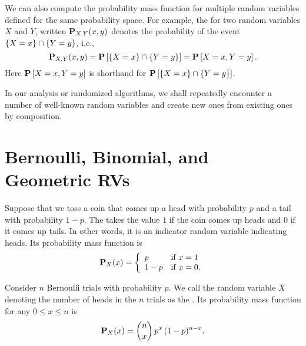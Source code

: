 \begin{gram}
We can also compute the probability mass function for multiple random
variables defined for the same probability space.
%
For example, the  for two random
variables $X$ and $Y$, written $\mathbf{P}_{X,Y}(x,y)$ denotes the
probability of the event $\{X =x\} \cap \{Y =y\}$, i.e.,
\[
\mathbf{P}_{X,Y}(x,y) = \mathbf{P}\left[{\{X =x\} \cap \{Y =y\}}\right] = \mathbf{P}\left[{X = x, Y = y}\right].
\]
%
Here
 $\mathbf{P}\left[{X = x, Y = y}\right]$ is shorthand for   $\mathbf{P}\left[{\{X =x\} \cap \{Y =y\}}\right]$.


In our analysis or randomized algorithms, we shall repeatedly
encounter a number of well-known random variables and create new ones
from existing ones by composition.
\end{gram}


\section{Bernoulli, Binomial, and Geometric RVs}
\label{sec:probability::randvar::standards}

\begin{gram}
Suppose that we toss a  coin that comes up a head with probability $p$
and a tail with probability $1-p$.
%
The  takes the value $1$ if the coin
comes up heads and $0$ if it comes up tails.
%
In other words, it is an indicator random variable indicating heads.
%
Its probability mass function is 
\[
\mathbf{P}_{X}(x) = 
\left\{
\begin{array}{ll}
p & \mbox{if}~x = 1
\\
1-p & \mbox{if}~x = 0.
\end{array}
\right.
\]
\end{gram}

\begin{gram}
Consider $n$ Bernoulli trials with probability $p$.  We call the
random variable $X$ denoting the number of heads in the $n$ trials as
the .
%
Its probability mass function for any $0 \le x \le n$ is 
%
\[
\mathbf{P}_{X}(x) = {n \choose x}\,p^x\,(1-p)^{n-x}.
\]
\end{gram}

